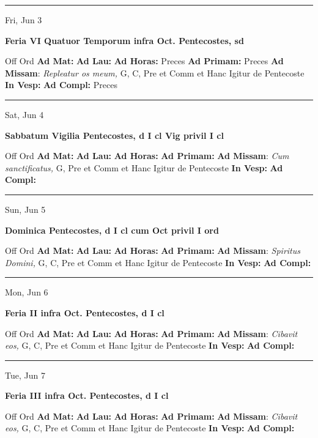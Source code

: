 \documentclass[letterpaper, 10pt]{article}
\begin{document}
\hrule
\begin{center}
Fri, Jun 3
\end{center}\textbf{ \large Feria VI Quatuor Temporum infra Oct. Pentecostes, \textnormal{\normalsize sd}}
\begin{justify}
Off Ord
\textbf{Ad Mat: }
\textbf{Ad Lau: }
\textbf{Ad Horas: }Preces
\textbf{Ad Primam: }Preces
\textbf{Ad Missam}: \textit{Repleatur os meum,} G, C, Pre et Comm et Hanc Igitur de Pentecoste
\textbf{In Vesp: }
\textbf{Ad Compl: }Preces\end{justify}



\hrule
\begin{center}
Sat, Jun 4
\end{center}\textbf{ \large Sabbatum Vigilia Pentecostes, \textnormal{\normalsize d I cl Vig privil I cl}}
\begin{justify}
Off Ord
\textbf{Ad Mat: }
\textbf{Ad Lau: }
\textbf{Ad Horas: }
\textbf{Ad Primam: }
\textbf{Ad Missam}: \textit{Cum sanctificatus,} G, Pre et Comm et Hanc Igitur de Pentecoste
\textbf{In Vesp: }
\textbf{Ad Compl: }\end{justify}



\hrule
\begin{center}
Sun, Jun 5
\end{center}\textbf{ \large Dominica Pentecostes, \textnormal{\normalsize d I cl cum Oct privil I ord}}
\begin{justify}
Off Ord
\textbf{Ad Mat: }
\textbf{Ad Lau: }
\textbf{Ad Horas: }
\textbf{Ad Primam: }
\textbf{Ad Missam}: \textit{Spiritus Domini,} G, C, Pre et Comm et Hanc Igitur de Pentecoste
\textbf{In Vesp: }
\textbf{Ad Compl: }\end{justify}



\hrule
\begin{center}
Mon, Jun 6
\end{center}\textbf{ \large Feria II infra Oct. Pentecostes, \textnormal{\normalsize d I cl}}
\begin{justify}
Off Ord
\textbf{Ad Mat: }
\textbf{Ad Lau: }
\textbf{Ad Horas: }
\textbf{Ad Primam: }
\textbf{Ad Missam}: \textit{Cibavit eos,} G, C, Pre et Comm et Hanc Igitur de Pentecoste
\textbf{In Vesp: }
\textbf{Ad Compl: }\end{justify}



\hrule
\begin{center}
Tue, Jun 7
\end{center}\textbf{ \large Feria III infra Oct. Pentecostes, \textnormal{\normalsize d I cl}}
\begin{justify}
Off Ord
\textbf{Ad Mat: }
\textbf{Ad Lau: }
\textbf{Ad Horas: }
\textbf{Ad Primam: }
\textbf{Ad Missam}: \textit{Cibavit eos,} G, C, Pre et Comm et Hanc Igitur de Pentecoste
\textbf{In Vesp: }
\textbf{Ad Compl: }\end{justify}
\end{document}
